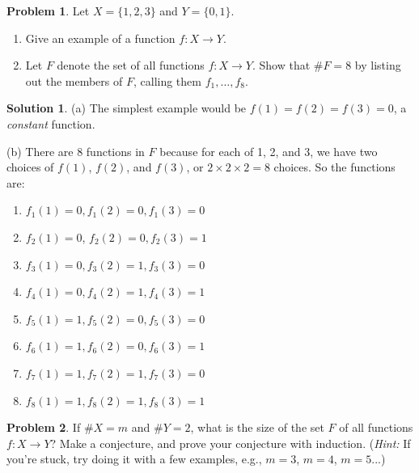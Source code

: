 \documentclass{article}
\numberwithin{equation}{section}
\theoremstyle{plain}
\theoremstyle{definition}
\newtheorem{problem}{Problem}
\newtheorem*{solution*}{Solution}
\begin{document}
\begin{problem}
	Let $X = \{1,2,3\}$ and $Y = \{0,1\}$. 
	\begin{enumerate}[label=(\alph*)]
		\item Give an example of a function $f : X \to Y$. 
		\item Let $F$ denote the set of all functions $f : X \to Y$. Show that $\#F = 8$ by listing out the members of $F$, calling them $f_1, \ldots, f_8$. 
	\end{enumerate}
\end{problem}

\begin{solution*}
	(a) The simplest example would be $f(1) = f(2) = f(3) = 0$, a \emph{constant} function. 
	
	(b) There are 8 functions in $F$ because for each of 1, 2, and 3, we have two choices of $f(1)$, $f(2)$, and $f(3)$, or $2 \times 2 \times 2 = 8$ choices. So the functions are: 
	\begin{enumerate}
		\item $f_1(1) = 0, f_1(2) = 0, f_1(3) = 0$
		\item $f_2(1) = 0$, $f_2(2) = 0, f_2(3) = 1$
		\item $f_3(1) = 0, f_3(2) = 1, f_3(3) = 0$
		\item $f_4(1) = 0, f_4(2) = 1, f_4(3) = 1$
		\item $f_5(1) = 1, f_5(2) = 0, f_5(3) = 0$
		\item $f_6(1) = 1, f_6(2) = 0, f_6(3) = 1$
		\item $f_7(1) = 1, f_7(2) = 1, f_7(3) = 0$
		\item $f_8(1) = 1, f_8(2) = 1, f_8(3) = 1$
	\end{enumerate}
\end{solution*}

\begin{problem}
	If $\#X = m$ and $\#Y = 2$, what is the size of the set $F$ of all functions $f : X \to Y$? Make a conjecture, and prove your conjecture with induction. (\emph{Hint:} If you're stuck, try doing it with a few examples, e.g., $m = 3$, $m = 4$, $m=5$...)
\end{problem}
\end{document}
